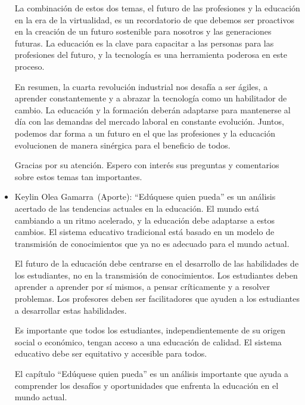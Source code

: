 \documentclass[letterpaper, 12pt]{article}
\newcommand{\memberKeys}{Keylin Olea Gamarra~}
\begin{document}
\begin{itemize}[label=$\triangleright$]
            La combinación de estos dos temas, el futuro de las
            profesiones y la educación en la era de la virtualidad, es
            un recordatorio de que debemos ser proactivos en la
            creación de un futuro sostenible para nosotros y las
            generaciones futuras. La educación es la clave para
            capacitar a las personas para las profesiones del futuro, y
            la tecnología es una herramienta poderosa en este proceso.

            En resumen, la cuarta revolución industrial nos desafía a
            ser ágiles, a aprender constantemente y a abrazar la
            tecnología como un habilitador de cambio. La educación y la
            formación deberán adaptarse para mantenerse al día con las
            demandas del mercado laboral en constante evolución.
            Juntos, podemos dar forma a un futuro en el que las
            profesiones y la educación evolucionen de manera sinérgica
            para el beneficio de todos.

            Gracias por su atención. Espero con interés sus preguntas y
            comentarios sobre estos temas tan importantes.

      \item \memberKeys (Aporte):
            ``Edúquese quien pueda'' es un análisis acertado de las tendencias actuales en la educación. El mundo está cambiando a un ritmo acelerado, y la educación debe adaptarse a estos cambios. El sistema educativo tradicional está basado en un modelo de transmisión de conocimientos que ya no es adecuado para el mundo actual.

            El futuro de la educación debe centrarse en el desarrollo
            de las habilidades de los estudiantes, no en la transmisión
            de conocimientos. Los estudiantes deben aprender a aprender
            por sí mismos, a pensar críticamente y a resolver
            problemas. Los profesores deben ser facilitadores que
            ayuden a los estudiantes a desarrollar estas habilidades.

            Es importante que todos los estudiantes, independientemente
            de su origen social o económico, tengan acceso a una
            educación de calidad. El sistema educativo debe ser
            equitativo y accesible para todos.

            El capítulo ``Edúquese quien pueda'' es un análisis
            importante que ayuda a comprender los desafíos y
            oportunidades que enfrenta la educación en el mundo actual.


\end{itemize}
\end{document}
